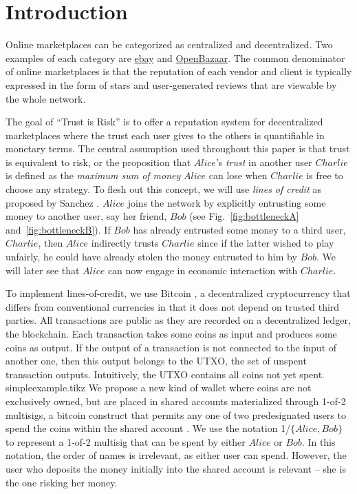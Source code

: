 \section{Introduction}
  Online marketplaces can be categorized as centralized and decentralized. Two examples of each category are
  \href{http://www.ebay.com}{ebay} and \href{https://openbazaar.org/}{OpenBazaar}. The common denominator of online
  marketplaces is that the reputation of each vendor and client is typically expressed in the form of stars and user-generated
  reviews that are viewable by the whole network.

  The goal of ``Trust is Risk'' is to offer a reputation system for decentralized marketplaces where the trust each user gives
  to the others is quantifiable in monetary terms. The central assumption used throughout this paper is that trust is
  equivalent to risk, or the proposition that $Alice$'s \textit{trust} in another user $Charlie$ is defined as the
  \textit{maximum sum of money} $Alice$ can lose when $Charlie$ is free to choose any strategy. To flesh out this concept, we
  will use \textit{lines of credit} as proposed by Sanchez \cite{loc}. $Alice$ joins the network by explicitly entrusting some
  money to another user, say her friend, $Bob$ (see Fig.~\ref{fig:bottleneckA} and~\ref{fig:bottleneckB}). If $Bob$ has
  already entrusted some money to a third user, $Charlie$, then $Alice$ indirectly trusts $Charlie$ since if the latter wished
  to play unfairly, he could have already stolen the money entrusted to him by $Bob$. We will later see that $Alice$ can now
  engage in economic interaction with $Charlie$.

  To implement lines-of-credit, we use Bitcoin \cite{bitcoin}, a decentralized cryptocurrency that differs from conventional
  currencies in that it does not depend on trusted third parties. All transactions are public as they are recorded on a
  decentralized ledger, the blockchain. Each transaction takes some coins as input and produces some coins as output. If the
  output of a transaction is not connected to the input of another one, then this output belongs to the UTXO, the set of
  unspent transaction outputs. Intuitively, the UTXO contains all coins not yet spent.
  {simpleexample.tikz}
  \noindent We propose a new kind of wallet where coins are not exclusively owned, but are placed in shared accounts materialized
  through 1-of-2 multisigs, a bitcoin construct that permits any one of two predesignated users to spend the coins within the
  shared account \cite{masteringbitcoin}. We use the notation 1/$\{Alice, Bob\}$ to represent a 1-of-2 multisig that can be
  spent by either $Alice$ or $Bob$. In this notation, the order of names is irrelevant, as either user can spend.  However,
  the user who deposits the money initially into the shared account is relevant -- she is the one risking her money.

